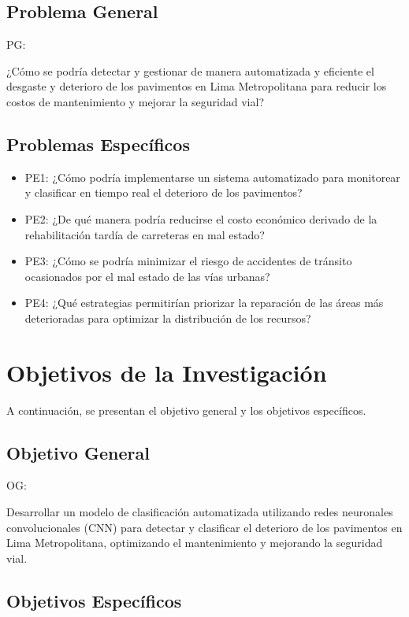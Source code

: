 	\subsection{Problema General}
	PG: \newcommand{\ProblemaGeneral}{
	¿Cómo se podría detectar y gestionar de manera automatizada y eficiente el desgaste y deterioro de los pavimentos en Lima Metropolitana para reducir los costos de mantenimiento y mejorar la seguridad vial?
	}
	\ProblemaGeneral
	\subsection{Problemas Específicos}
	\newcommand{\Pbone}{
	¿Cómo podría implementarse un sistema automatizado para monitorear y clasificar en tiempo real el deterioro de los pavimentos?
	}
	\newcommand{\Pbtwo}{
	¿De qué manera podría reducirse el costo económico derivado de la rehabilitación tardía de carreteras en mal estado?
	}
	\newcommand{\Pbthree}{
	¿Cómo se podría minimizar el riesgo de accidentes de tránsito ocasionados por el mal estado de las vías urbanas?
	}
	\newcommand{\Pbfour}{
	¿Qué estrategias permitirían priorizar la reparación de las áreas más deterioradas para optimizar la distribución de los recursos?
	}

	\begin{itemize}
		\item PE1: {\Pbone}
		\item PE2: {\Pbtwo}
		\item PE3: {\Pbthree}
		\item PE4: {\Pbfour}
	\end{itemize}

	\section{Objetivos de la Investigación}
	A continuación, se presentan el objetivo general y los objetivos específicos.
	\subsection{Objetivo General}
	OG: \newcommand{\ObjetivoGeneral}{
	Desarrollar un modelo de clasificación automatizada utilizando redes neuronales convolucionales (CNN) para detectar y clasificar el deterioro de los pavimentos en Lima Metropolitana, optimizando el mantenimiento y mejorando la seguridad vial.
	}
	\ObjetivoGeneral
	\subsection{Objetivos Específicos}
	\newcommand{\Objone}{
	Implementar un sistema de monitoreo y clasificación basado en IA y visión por computadora para la identificación de grietas y baches en tiempo real.
	}
	\newcommand{\Objtwo}{
	Analizar el impacto económico de la detección temprana de daños en la infraestructura vial de Lima.
	}
	\newcommand{\Objthree}{
	Priorizar áreas críticas de deterioro para optimizar el uso de los recursos en las intervenciones de mantenimiento.
	}
	\newcommand{\Objfour}{
	Evaluar la precisión y eficiencia del modelo propuesto frente a métodos tradicionales de inspección vial.
	}

